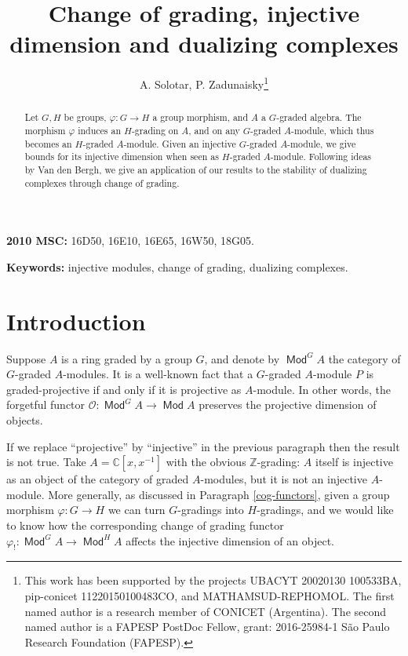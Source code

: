 \documentclass[11pt,fleqn]{article}
\title{
Change of grading, injective dimension and dualizing complexes
}
\author{A. Solotar,
P. Zadunaisky\footnote{This work has been supported by the projects 
UBACYT 20020130 100533BA, pip-conicet 11220150100483CO, and 
MATHAMSUD-REPHOMOL. The first named author is a research member of CONICET 
(Argentina). The second named author is a FAPESP PostDoc Fellow, grant: 
2016-25984-1 S\~ao Paulo Research Foundation (FAPESP).}
}
\date{}
\newcommand\CC{\mathbb C}
\newcommand\ZZ{\mathbb Z}
\renewcommand\to{\longrightarrow}
\renewcommand\phi{\varphi}
\renewcommand\O{\mathcal O}
\DeclareMathOperator\Mod{\mathsf{Mod}}
\begin{document}
\maketitle

\begin{abstract}
Let $G,H$ be groups, $\phi: G \to H$ a group morphism, and $A$ a $G$-graded 
algebra. The morphism $\phi$ induces an $H$-grading on $A$, and on any 
$G$-graded $A$-module, which thus becomes an $H$-graded $A$-module.
Given an injective $G$-graded $A$-module, we give bounds for its injective
dimension when seen as $H$-graded $A$-module. Following ideas by Van den
Bergh, we give an application of our results to the stability of dualizing
complexes through change of grading.
\end{abstract}

\textbf{2010 MSC:} 16D50, 16E10, 16E65, 16W50, 18G05.

\textbf{Keywords:} injective modules, change of grading, dualizing complexes.

\section{Introduction}

Suppose $A$ is a ring graded by a group $G$, and denote by $\Mod^G A$ the 
category of $G$-graded $A$-modules. It is a well-known fact that a $G$-graded 
$A$-module $P$ is graded-projective if and only if it is projective as 
$A$-module. In other words, the forgetful functor $\O: \Mod^G A \to \Mod A$ 
preserves the projective dimension of objects.

If we replace ``projective'' by ``injective'' in the previous paragraph then 
the result is not true. Take $A = \CC[x,x^{-1}]$ with the obvious 
$\ZZ$-grading: $A$ itself is injective as an object of the category of graded 
$A$-modules, but it is not an injective $A$-module. More generally, as 
discussed in Paragraph \ref{cog-functors}, given a group morphism $\phi: G 
\to H$ we can turn $G$-gradings into $H$-gradings, and we would like to know 
how the corresponding change of grading functor $\phi_!: \Mod^G A \to \Mod^H A$
affects the injective dimension of an object. 
\end{document}

